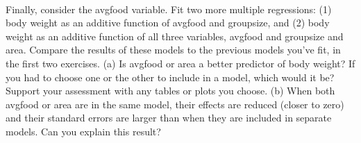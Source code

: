 \documentclass[12pt]{article}\usepackage[]{graphicx}\usepackage[]{color}
\newenvironment{problem}[2][Problem]{\begin{trivlist}
\item[\hskip \labelsep {\bfseries #1}\hskip \labelsep {\bfseries #2.}]}{\end{trivlist}}
\begin{document}
\begin{problem}{5H3}
\text{ }\\
Finally, consider the avgfood variable. Fit two more multiple regressions: (1) body weight as an additive function of avgfood and groupsize, and (2) body weight as an additive function of all three variables, avgfood and groupsize and area. Compare the results of these models to the previous models you've fit, in the first two exercises. (a) Is avgfood or area a better predictor of body weight? If you had to choose one or the other to include in a model, which would it be? Support your assessment with any tables or plots you choose. (b) When both avgfood or area are in the same model, their effects are reduced (closer to zero) and their standard errors are larger than when they are included in separate models. Can you explain this result?
\end{problem}
\end{document}
